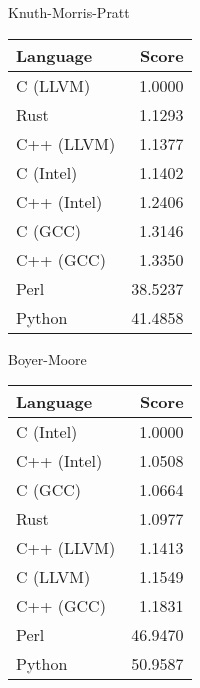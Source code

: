 \begin{subtable}{0.33\textwidth}
    \centering
    \caption{Knuth-Morris-Pratt}
    \label{table:runtime:kmp}
    \begin{tabular}{|l|r|}
        \hline
        Language & Score \\
        \hline
        C (LLVM) & 1.0000 \\
        Rust & 1.1293 \\
        C++ (LLVM) & 1.1377 \\
        C (Intel) & 1.1402 \\
        C++ (Intel) & 1.2406 \\
        C (GCC) & 1.3146 \\
        C++ (GCC) & 1.3350 \\
        Perl & 38.5237 \\
        Python & 41.4858 \\
        \hline
    \end{tabular}
\end{subtable}%
\begin{subtable}{0.33\textwidth}
    \centering
    \caption{Boyer-Moore}
    \label{table:runtime:boyer_moore}
    \begin{tabular}{|l|r|}
        \hline
        Language & Score \\
        \hline
        C (Intel) & 1.0000 \\
        C++ (Intel) & 1.0508 \\
        C (GCC) & 1.0664 \\
        Rust & 1.0977 \\
        C++ (LLVM) & 1.1413 \\
        C (LLVM) & 1.1549 \\
        C++ (GCC) & 1.1831 \\
        Perl & 46.9470 \\
        Python & 50.9587 \\
        \hline
    \end{tabular}
\end{subtable}%
